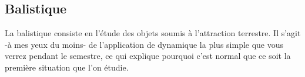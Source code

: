 \documentclass{article}
\begin{document}

\subsection{Balistique}
La balistique consiste en l'étude des objets soumis à l'attraction terrestre. Il s'agit -à mes yeux du moins- de l'application de dynamique la plus simple que vous verrez pendant le semestre, ce qui explique pourquoi c'est normal que ce soit la première situation que l'on étudie. 
\end{document}
